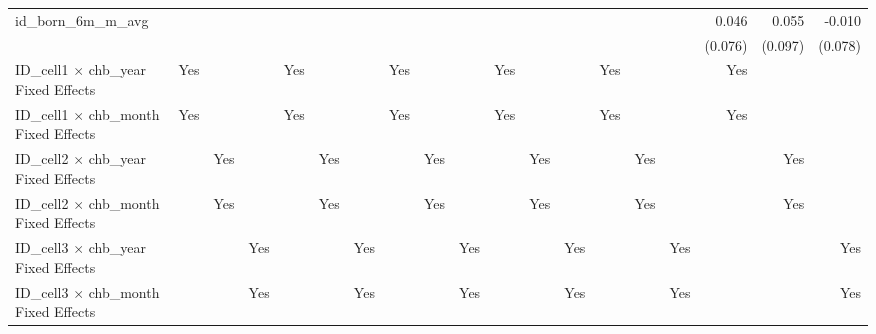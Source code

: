 \begin{tabular}{lrrrrrrrrrrrrrrrrrr}
id\_born\_6m\_m\_avg                        &             &             &             &             &             &             &             &             &             &             &             &             &             &             &             &       0.046 &       0.055 &      -0.010 \\ 
                                            &             &             &             &             &             &             &             &             &             &             &             &             &             &             &             &     (0.076) &     (0.097) &     (0.078) \\ 
\midrule
ID\_cell1 $\times$ chb\_year Fixed Effects  &         Yes &             &             &         Yes &             &             &         Yes &             &             &         Yes &             &             &         Yes &             &             &         Yes &             &             \\ 
ID\_cell1 $\times$ chb\_month Fixed Effects &         Yes &             &             &         Yes &             &             &         Yes &             &             &         Yes &             &             &         Yes &             &             &         Yes &             &             \\ 
ID\_cell2 $\times$ chb\_year Fixed Effects  &             &         Yes &             &             &         Yes &             &             &         Yes &             &             &         Yes &             &             &         Yes &             &             &         Yes &             \\ 
ID\_cell2 $\times$ chb\_month Fixed Effects &             &         Yes &             &             &         Yes &             &             &         Yes &             &             &         Yes &             &             &         Yes &             &             &         Yes &             \\ 
ID\_cell3 $\times$ chb\_year Fixed Effects  &             &             &         Yes &             &             &         Yes &             &             &         Yes &             &             &         Yes &             &             &         Yes &             &             &         Yes \\ 
ID\_cell3 $\times$ chb\_month Fixed Effects &             &             &         Yes &             &             &         Yes &             &             &         Yes &             &             &         Yes &             &             &         Yes &             &             &         Yes \\ 

\end{tabular}
